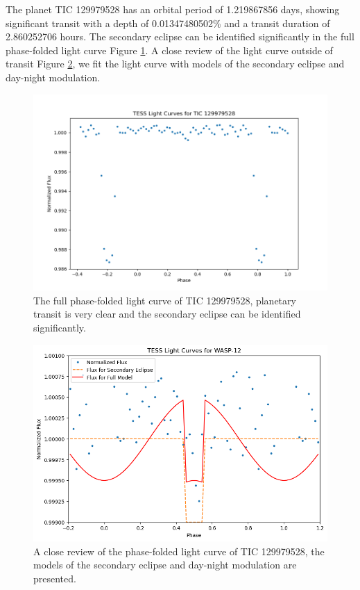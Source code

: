 \documentclass{article}
\begin{document}
The planet TIC 129979528 has an orbital period of 1.219867856 days, showing significant transit with a depth of 0.01347480502\% and a transit duration of 2.860252706 hours. The secondary eclipse can be identified significantly in the full phase-folded light curve Figure \ref{fig:129979528_folded}. A close review of the light curve outside of transit Figure \ref{fig:129979528}, we fit the light curve with models of the secondary eclipse and day-night modulation.\begin{figure}[H]\centering\includegraphics[width=0.7\linewidth]{image/129979528_folded.png}\captionsetup{font=small} \caption{The full phase-folded light curve of TIC 129979528, planetary transit is very clear and the secondary eclipse can be identified significantly.}\label{fig:129979528_folded}\end{figure}\begin{figure}[H]\centering\includegraphics[width=0.65\linewidth]{image/129979528.png}\captionsetup{font=small} \caption{A close review of the phase-folded light curve of TIC 129979528, the models of the secondary eclipse and day-night modulation are presented.}\label{fig:129979528}\end{figure}
\newpage
\end{document}
